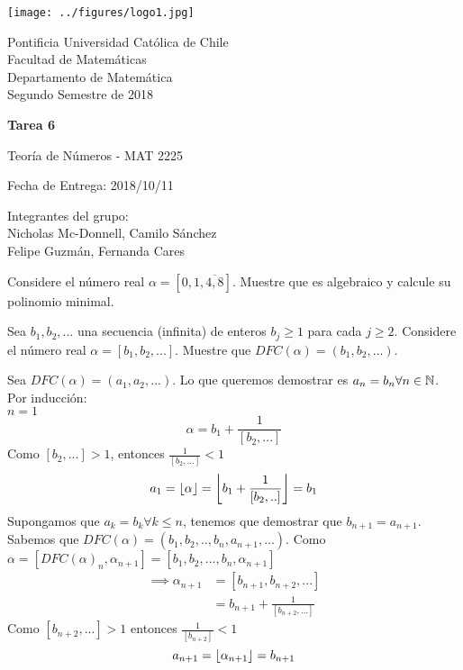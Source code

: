 


\begin{minipage}{2.5cm}
	\texttt{[image: ../figures/logo1.jpg]}
\end{minipage}
\begin{minipage}{13cm}
	\begin{flushleft}
		\raggedright
		{
			\noindent
			{\sc Pontificia Universidad Católica de Chile\\
				Facultad de Matemáticas\\
				Departamento de Matemática} \smallskip \\
			Segundo Semestre de 2018\\
		}
	\end{flushleft}
\end{minipage}

\vspace{2ex}
{\Large \centerline{\bf Tarea 6}}
{\large \centerline{Teoría de Números - MAT 2225}}
\centerline{Fecha de Entrega: 2018/10/11}

\begin{flushright}
	Integrantes del grupo:\\
	Nicholas Mc-Donnell, Camilo Sánchez\\
	Felipe Guzmán, Fernanda Cares
\end{flushright}

\begin{prob}[5 pts.]
	Considere el número real $\alpha=[0,1,\overline{4,8}]$. Muestre que es algebraico y calcule su polinomio minimal.
\end{prob}

\begin{sol}

\end{sol}

\begin{prob}[5 pts.]
	Sea $b_1,b_2,...$ una secuencia (infinita) de enteros $b_j\geq1$ para cada $j\geq2$. Considere el número real $\alpha=[b_1,b_2,...]$. Muestre que $DFC(\alpha)=(b_1,b_2,...)$.
\end{prob}

\begin{sol}
	Sea $DFC(\alpha)=(a_1,a_2,...)$. Lo que queremos demostrar es $a_n=b_n \forall n\in\mathbb{N}$.\\
	Por inducción:\\
	$n=1$
	\[\alpha=b_1+\frac{1}{[b_2,...]}\]
	Como $[b_2,...]>1$, entonces $\frac{1}{[b_2,...]}<1$
	\[a_1=\left\lfloor\alpha\right\rfloor=\left\lfloor b_1+\frac{1}{[b_2,..]}\right\rfloor=b_1\]
	Supongamos que $a_k=b_k\forall k\leq n$, tenemos que demostrar que $b_{n+1}=a_{n+1}$. Sabemos que $DFC(\alpha)=(b_1,b_2,..,b_n,a_{n+1},...)$. Como $\alpha=[DFC(\alpha)_n,\alpha_{n+1}]=[b_1,b_2,...,b_n,\alpha_{n+1}]$
	\begin{align*}
		\implies \alpha_{n+1} & =[b_{n+1},b_{n+2},...]           \\
		                      & =b_{n+1}+\frac{1}{[b_{n+2},...]}
	\end{align*}
	Como $[b_{n+2},...]>1$ entonces $\frac{1}{[b_{n+2}]}<1$
	\begin{equation*}
		a_{n+1}=\left\lfloor\alpha_{n+1}\right\rfloor=b_{n+1}
	\end{equation*}
\end{sol}

